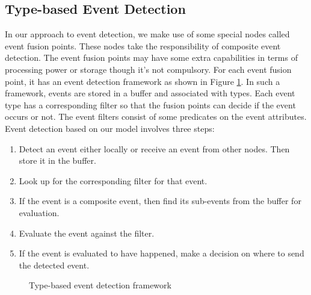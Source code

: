 \subsection{Type-based Event Detection}
In our approach to event detection, we make use of some special nodes called event fusion points. These nodes take the responsibility of composite event detection. The event fusion points may have some extra capabilities in terms of processing power or storage though it's not compulsory. For each event fusion point, it has an event detection framework as shown in Figure \ref{fig:eventdetectionframework2}. In such a framework, events are stored in a buffer and associated with types. Each event type has a corresponding filter so that the fusion points can decide if the event occurs or not. The event filters consist of some predicates on the event attributes.
Event detection based on our model involves three steps:
\begin{enumerate}
\item Detect an event either locally or receive an event from other nodes. Then store it in the buffer. 
\item Look up for the corresponding filter for that event.
\item If the event is a composite event, then find its sub-events from the buffer for evaluation.
\item Evaluate the event against the filter.
\item If the event is evaluated to have happened, make a decision on where to send the detected event.
\end{enumerate}

\begin{figure}
\centering
{}
\caption{Type-based event detection framework}
\label{fig:eventdetectionframework2}
\end{figure}

